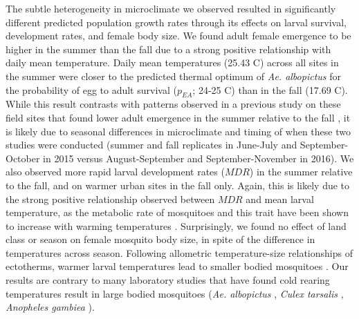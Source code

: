 \documentclass[12pt]{article}
\begin{document}

The subtle heterogeneity in microclimate we observed resulted in significantly different predicted population growth rates through its effects on larval survival, development rates, and female body size. We found adult female emergence to be higher in the summer than the fall due to a strong positive relationship with daily mean temperature. Daily mean temperatures (25.43 \degree C) across all sites in the summer were closer to the predicted thermal optimum of \textit{Ae. albopictus} for the probability of egg to adult survival ($p_{EA}$; 24-25 \degree C) \citep{mordecai2017} than in the fall (17.69 \degree C). While this result contrasts with patterns observed in a previous study on these field sites that found lower adult emergence in the summer relative to the fall \citep{murdock2017}, it is likely due to seasonal differences in microclimate and timing of when these two studies were conducted (summer and fall replicates in June-July and September-October in 2015 versus August-September and September-November in 2016). We also observed more rapid larval development rates ($MDR$) in the summer relative to the fall, and on warmer urban sites in the fall only. Again, this is likely due to the strong positive relationship observed between $MDR$ and  mean larval temperature, as the metabolic rate of mosquitoes and this trait have been shown to increase with warming temperatures \citep{delatte2009,mordecai2017}. Surprisingly, we found no effect of land class or season on female mosquito body size, in spite of the difference in temperatures across season. Following allometric temperature-size relationships of ectotherms, warmer larval temperatures lead to smaller bodied mosquitoes \citep{angilleta2004,kingsolver2008}. Our results are contrary to many laboratory studies that have found cold rearing temperatures result in large bodied mosquitoes (\textit{Ae. albopictus} \citep{reiskind2012a}, \textit{Culex tarsalis} \citep{dodson2012}, \textit{Anopheles gambiea} \citep{koella1996}).
\end{document}
